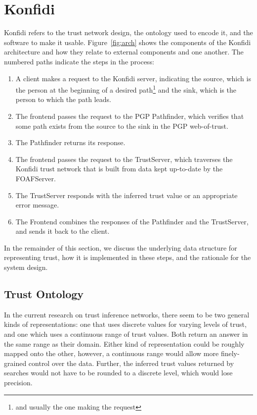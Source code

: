 \documentclass[letterpaper]{www2006-submission}
\begin{document}
\section{Konfidi}

Konfidi refers to the trust network design, the ontology used to encode it, and the software to make it usable.  Figure~\ref{fig:arch} shows the components of the Konfidi architecture and how they relate to external components and one another.  The numbered paths indicate the steps in the process:  

\begin{enumerate}
\item  A client makes a request to the Konfidi server, indicating the source, which is the person at the beginning of a desired path\footnote{and usually the one making the request} and the sink, which is the person to which the path leads.
\item  The frontend passes the request to the PGP Pathfinder, which verifies that some path exists from the source to the sink in the PGP web-of-trust.
\item  The Pathfinder returns its response.
\item  The frontend passes the request to the TrustServer, which traverses the Konfidi trust network that is built from data kept up-to-date by the FOAFServer.
\item  The TrustServer responds with the inferred trust value or an appropriate error message.
\item  The Frontend combines the responses of the Pathfinder and the TrustServer, and sends it back to the client.
\end{enumerate}

In the remainder of this section, we discuss the underlying data structure for representing trust, how it is implemented in these steps, and the rationale for the system design.

\subsection{Trust Ontology}
In the current research on trust inference networks, there seem to be two general kinds of representations:  one that uses discrete values for varying levels of trust, and one which uses a continuous range of trust values.  Both return an answer in the same range as their domain.  Either kind of representation could be roughly mapped onto the other, however, a continuous range would allow more finely-grained control over the data.  Further, the inferred trust values returned by searches would not have to be rounded to a discrete level, which would lose precision.
\end{document}
